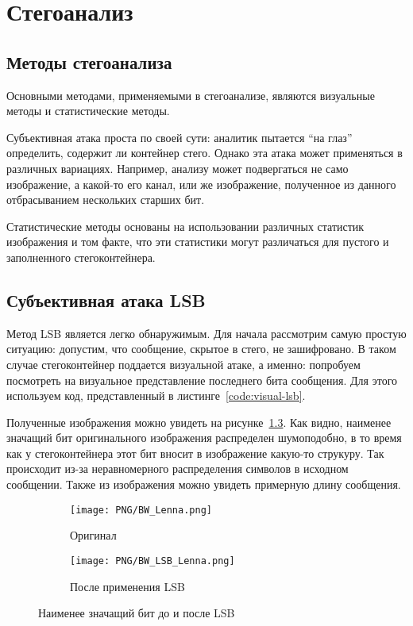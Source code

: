 \chapter{Стегоанализ}
\section{Методы стегоанализа}
Основными методами, применяемыми в стегоанализе, являются визуальные методы и статистические методы.

Субъективная атака проста по своей сути: аналитик пытается ``на глаз'' определить, содержит ли контейнер стего.
Однако эта атака может применяться в различных вариациях. Например, анализу может подвергаться не само изображение,
а какой-то его канал, или же изображение, полученное из данного отбрасыванием нескольких старших бит.

Статистические методы основаны на использовании различных статистик изображения и том факте,
что эти статистики могут различаться для пустого и заполненного стегоконтейнера.

\section{Субъективная атака LSB}
Метод LSB является легко обнаружимым.
Для начала рассмотрим самую простую ситуацию: допустим,
что сообщение, скрытое в стего, не зашифровано.
В таком случае стегоконтейнер поддается визуальной атаке,
а именно: попробуем посмотреть на визуальное представление
последнего бита сообщения. Для этого используем код,
представленный в листинге~\ref{code:visual-lsb}.

Полученные изображения можно увидеть на рисунке~\ref{img:bw-lsb}.
Как видно, наименее значащий бит оригинального изображения распределен
шумоподобно, в то время как у стегоконтейнера этот бит
вносит в изображение какую-то струкуру. Так происходит из-за
неравномерного распределения символов в исходном сообщении.
Также из изображения можно увидеть примерную длину сообщения.
\begin{figure}[ht!]
    \centering
    \begin{subfigure}{.5\textwidth}
      \centering
      \texttt{[image: PNG/BW\_Lenna.png]}
      \caption{Оригинал}
      \label{img:bw-lenna-png}
    \end{subfigure}%
    \begin{subfigure}{.5\textwidth}
      \centering
      \texttt{[image: PNG/BW\_LSB\_Lenna.png]}
      \caption{После применения LSB}
      \label{img:bw-lenna-lsb}
    \end{subfigure}
    \caption{Наименее значащий бит до и после LSB}
    \label{img:bw-lsb}
\end{figure}

